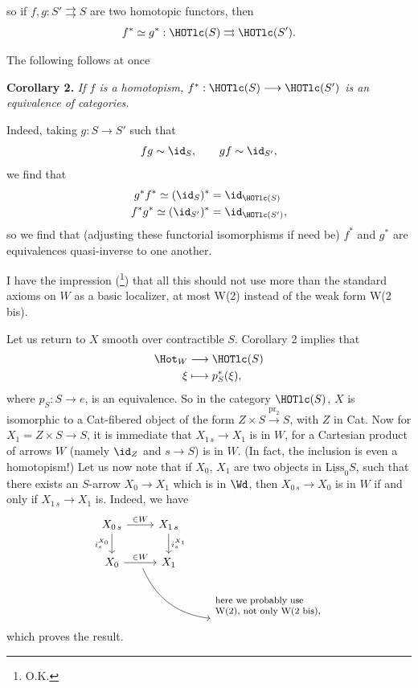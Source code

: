 
so if $f,g : S' \rightrightarrows S$ are two homotopic functors, then
\[ f^* \simeq g^* : \HOTlc(S) \rightrightarrows \HOTlc(S'). \]

The following follows at once

\textbf{Corollary 2.} \textit{If $f$ is a homotopism, $f^* : \HOTlc(S) \longrightarrow \HOTlc(S')$ is an equivalence of categories.}

Indeed, taking $g : S \longrightarrow S'$ such that
\[ fg \sim \id_S, \qquad gf \sim \id_{S'}, \]
we find that
\[ \begin{aligned}
g^*f^* \simeq (\id_S)^* &= \id_{\HOTlc(S)} \\
f^*g^* \simeq (\id_{S'})^* &= \id_{\HOTlc(S')},
\end{aligned} \]
so we find that (adjusting these functorial isomorphisms if need be) $f^*$ and $g^*$ are equivalences quasi-inverse to one another.

I have the impression (\footnote[54]{O.K.}) that all this should not use more than the standard axioms on $W$ as a basic localizer, at most W(2) instead of the weak form W(2 bis).

Let us return to $X$ smooth over contractible $S$. Corollary 2 implies that
\[ \begin{aligned}
\Hot_W &\longrightarrow \HOTlc(S) \\
\xi &\longmapsto p^*_S(\xi),
\end{aligned} \]
where $p_S : S \longrightarrow e$, is an equivalence. So in the category $\HOTlc(S)$, $X$ is isomorphic  to a Cat-fibered object of the form $Z \times S \xrightarrow{\mathrm{pr}_2} S$, with $Z$ in Cat. Now for $X_1 = Z \times S \longrightarrow S$, it is immediate that $X_{1\,s} \longrightarrow X_1$ is in $W$, for a Cartesian product of arrows $W$ (namely $\id_Z$ and $s \longrightarrow S$) is in $W$. (In fact, the inclusion is even a homotopism!) Let us now note that if $X_0$, $X_1$ are two objects in $\underline{\mathrm{Liss}}_0S$, such that there exists an $S$-arrow $X_0 \longrightarrow X_1$ which is in $\Wd$, then $X_{0\,s} \longrightarrow X_0$ is in $W$ if and only if $X_{1\,s} \longrightarrow X_1$ is. Indeed, we have
\[ \begin{tikzcd}
X_{0\,s} \arrow[r, "\in W"] \arrow[d, "i_s^{X_0}"'] & X_{1\,s} \arrow[d, "i_s^{X_1}"] & \\
X_0 \arrow[r, "\in W", ""{name=A, below}] & X_1 & \\
 & & \text{\footnotesize\begin{tabular}{@{}l@{}}here we probably use\\ W(2), not only W(2 bis),\end{tabular}}
\arrow[from=A, to=3-3, bend right]
\end{tikzcd} \]
which proves the result.

